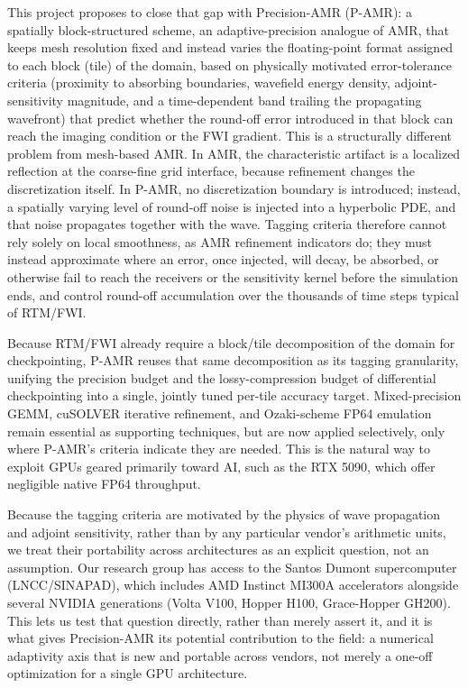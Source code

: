 \documentclass[12pt,a4paper]{article}
\newcommand{\pamr}{P\nobreakdash-AMR}
\begin{document}
This project proposes to close that gap with Precision-AMR (\pamr{}): a
spatially block-structured scheme, an adaptive-precision analogue of AMR,
that keeps mesh resolution fixed and instead varies the floating-point
format assigned to each block (tile) of the domain, based on physically
motivated error-tolerance criteria (proximity to absorbing boundaries,
wavefield energy density, adjoint-sensitivity magnitude, and a
time-dependent band trailing the propagating wavefront) that predict whether
the round-off error introduced in that block can reach the imaging
condition or the FWI gradient. This is a structurally different problem
from mesh-based AMR. In AMR, the characteristic artifact is a localized
reflection at the coarse-fine grid interface, because refinement changes
the discretization itself. In \pamr{}, no discretization boundary is
introduced; instead, a spatially varying level of round-off noise is
injected into a hyperbolic PDE, and that noise propagates together with the
wave. Tagging criteria therefore cannot rely solely on local smoothness, as
AMR refinement indicators do; they must instead approximate where an error,
once injected, will decay, be absorbed, or otherwise fail to reach the
receivers or the sensitivity kernel before the simulation ends, and control
round-off accumulation over the thousands of time steps typical of RTM/FWI.

Because RTM/FWI already require a block/tile decomposition of the domain
for checkpointing, \pamr{} reuses that same decomposition as its tagging
granularity, unifying the precision budget and the lossy-compression budget
of differential checkpointing into a single, jointly tuned per-tile accuracy
target. Mixed-precision GEMM, cuSOLVER iterative refinement, and
Ozaki-scheme FP64 emulation remain essential as supporting techniques, but
are now applied selectively, only where \pamr{}'s criteria indicate they are
needed. This is the natural way to exploit GPUs geared primarily toward AI,
such as the RTX 5090, which offer negligible native FP64 throughput.

Because the tagging criteria are motivated by the physics of wave
propagation and adjoint sensitivity, rather than by any particular vendor's
arithmetic units, we treat their portability across architectures as an
explicit question, not an assumption. Our research group has access to the
Santos Dumont supercomputer (LNCC/SINAPAD), which includes AMD Instinct
MI300A accelerators alongside several NVIDIA generations (Volta V100, Hopper
H100, Grace-Hopper GH200). This lets us test that question directly, rather
than merely assert it, and it is what gives Precision-AMR its potential
contribution to the field: a numerical adaptivity axis that is new and
portable across vendors, not merely a one-off optimization for a single GPU
architecture.
\end{document}
